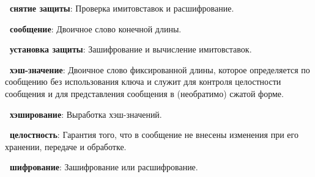 {\bf \thedefctr~снятие защиты}:
Проверка имитовставок и расшифрование.

{\bf \thedefctr~сообщение}:
Двоичное слово конечной длины.

{\bf \thedefctr~установка защиты}:
Зашифрование и вычисление имитовставок.

{\bf \thedefctr~хэш-значение}:
Двоичное слово фиксированной длины, 
которое определяется по сообщению без использования ключа и 
служит для контроля целостности сообщения и для представления 
сообщения в (необратимо) сжатой форме.

{\bf \thedefctr~хэширование}:
Выработка хэш-значений.

{\bf \thedefctr~целостность}:
Гарантия того, что в сообщение не внесены изменения
при его хранении, передаче и обработке.

{\bf \thedefctr~шифрование}:
Зашифрование или расшифрование.

